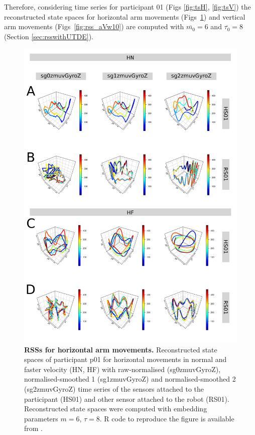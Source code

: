 Therefore, considering time series for participant 01 
(Figs \ref{fig:tsH}, \ref{fig:tsV}) the reconstructed state spaces
for horizontal arm movements (Figs~\ref{fig:rss_aHw10}) and
 vertical arm movements  (Figs~\ref{fig:rss_aVw10}) 
are computed with $\overline{m_0}=6$ and $\overline{\tau_0}=8$ 
(Section \ref{sec:rsswithUTDE}).
\begin{figure}
\centering
\includegraphics[height=0.85\textheight]{rss_aH}
\caption{
	{\bf RSSs for horizontal arm movements.}
	Reconstructed state spaces %
	of participant p01 for horizontal movements in normal and faster 
	velocity (HN, HF) with raw-normalised (sg0zmuvGyroZ), 
	normalised-smoothed 1 (sg1zmuvGyroZ) and 
	normalised-smoothed 2 (sg2zmuvGyroZ) time series of the 
	sensors attached to the participant (HS01) and other sensor 
	attached to the robot (RS01).	
	Reconstructed state spaces were computed with 
	embedding parameters $m=6$, $\tau=8$.
	R code to reproduce the figure is available from \cite{hwum2018}.
        }
    \label{fig:rss_aHw10}
\end{figure}
